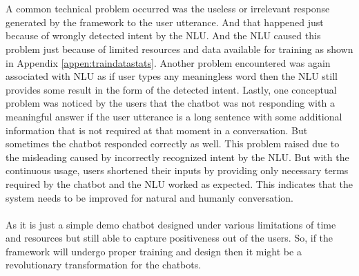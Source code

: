 \\~\\
A common technical problem occurred was the useless or irrelevant response generated by the framework to the user utterance. And that happened just because of wrongly detected intent by the NLU. And the NLU caused this problem just because of limited resources and data available for training as shown in Appendix \ref{appen:traindatastats}. Another problem encountered was again associated with NLU as if user types any meaningless word then the NLU still provides some result in the form of the detected intent. Lastly, one conceptual problem was noticed by the users that the chatbot was not responding with a meaningful answer if the user utterance is a long sentence with some additional information that is not required at that moment in a conversation. But sometimes the chatbot responded correctly as well. This problem raised due to the misleading caused by incorrectly recognized intent by the NLU. But with the continuous usage, users shortened their inputs by providing only necessary terms required by the chatbot and the NLU worked as expected. This indicates that the system needs to be improved for natural and humanly conversation.
\\~\\
As it is just a simple demo chatbot designed under various limitations of time and resources but still able to capture positiveness out of the users. So, if the framework will undergo proper training and design then it might be a revolutionary transformation for the chatbots.

